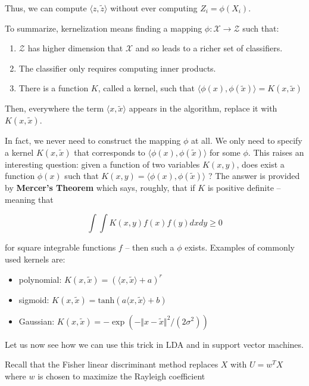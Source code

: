 Thus, we can compute \(\langle z, \tilde{z} \rangle\) without ever
computing \(Z_{i} = \phi(X_{i})\).

To summarize, kernelization means finding a mapping
\(\phi: \mathcal{X} \rightarrow \mathcal{Z}\) such that:

\begin{enumerate}
\def\labelenumi{\arabic{enumi}.}
\item
  \(\mathcal{Z}\) has higher dimension that \(\mathcal{X}\) and so leads
  to a richer set of classifiers.
\item
  The classifier only requires computing inner products.
\item
  There is a function \(K\), called a kernel, such that
  \(\langle \phi(x), \phi(\tilde{x}) \rangle = K(x, \tilde{x})\)
\end{enumerate}

Then, everywhere the term \(\langle x, \tilde{x} \rangle\) appears in
the algorithm, replace it with \(K(x, \tilde{x})\).

In fact, we never need to construct the mapping \(\phi\) at all. We only
need to specify a kernel \(K(x, \tilde{x})\) that corresponds to
\(\langle \phi(x), \phi(\tilde{x}) \rangle\) for some \(\phi\). This
raises an interesting question: given a function of two variables
\(K(x, y)\), does exist a function \(\phi(x)\) such that
\(K(x, y) = \langle \phi(x), \phi(\tilde{x}) \rangle\) ? The answer is
provided by \textbf{Mercer's Theorem} which says, roughly, that if \(K\)
is positive definite -- meaning that

\[ \int \int K(x, y) f(x) f(y) dx dy \geq 0 \]

for square integrable functions \(f\) -- then such a \(\phi\) exists.
Examples of commonly used kernels are:

\begin{itemize}[tightlist]
\item
  polynomial: \(K(x, \tilde{x}) = (\langle x, \tilde{x} \rangle + a)^r\)
\item
  sigmoid:
  \(K(x, \tilde{x}) = \text{tanh} (a \langle x, \tilde{x} \rangle + b)\)
\item
  Gaussian:
  \(K(x, \tilde{x}) = -\exp \left( - \Vert x - \tilde{x} \Vert^{2} / (2 \sigma^{2}) \right)\)
\end{itemize}

Let us now see how we can use this trick in LDA and in support vector
machines.

Recall that the Fisher linear discriminant method replaces \(X\) with
\(U = w^T X\) where \(w\) is chosen to maximize the Rayleigh coefficient

